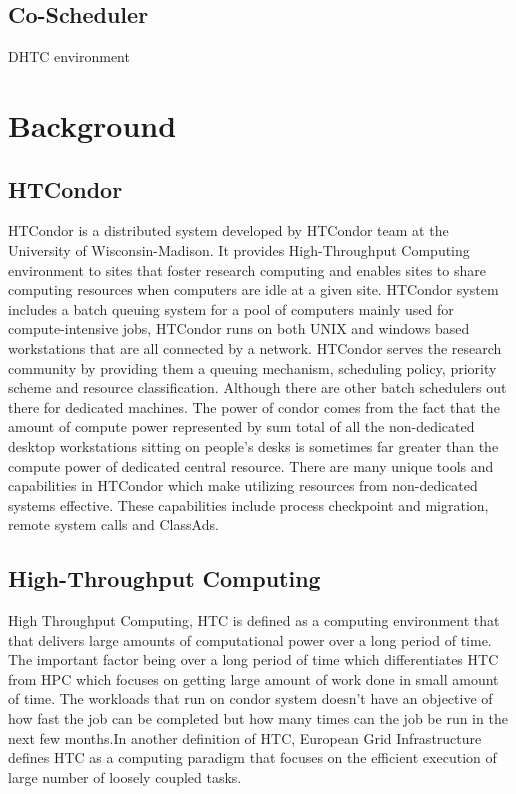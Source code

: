 \documentclass[ms,electronic,double]{nuthesis}
\begin{document}
\section{Co-Scheduler}

DHTC environment


\chapter{Background}

\section{HTCondor} HTCondor is a distributed system developed by HTCondor team at the 
University of Wisconsin-Madison. It provides High-Throughput Computing environment to sites 
that foster research computing and enables sites to share computing resources when 
computers are idle at a given site. HTCondor system includes a batch queuing 
system for a pool of computers mainly used for compute-intensive jobs, HTCondor runs on both
 UNIX and windows based workstations that are all connected by a network.  
 HTCondor serves the research community by providing them a queuing mechanism, 
 scheduling policy, priority scheme and resource classification. Although there are other 
 batch schedulers out there for dedicated machines. The power of condor comes from 
 the fact that  the amount of compute power represented by sum total of all the 
 non-dedicated desktop workstations sitting on people's desks is sometimes far 
 greater than the compute power of dedicated central resource. There are many 
 unique tools and capabilities in HTCondor which make utilizing resources from 
 non-dedicated systems effective. These capabilities include process checkpoint 
 and migration, remote system calls and ClassAds.


\section{High-Throughput Computing} High Throughput Computing, HTC is defined as 
a computing environment that that delivers large amounts of computational
power over a long period of time.  The important factor being over a long period of time which 
differentiates HTC from HPC which focuses on getting large amount of work done in small amount of time.
The workloads that run on condor system doesn't have an objective of  how fast the job can be completed 
but how many times can the job be run in the next few months.In another definition of HTC, European Grid  
Infrastructure defines HTC as a computing paradigm that focuses on the efficient 
execution of large number of loosely coupled tasks.
\end{document}
